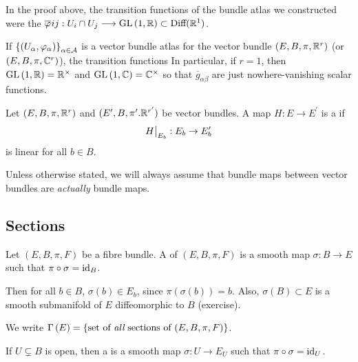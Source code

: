 \documentclass[main.tex]{subfiles}
\begin{document}
\begin{note}
In the proof above, the transition functions of the bundle atlas we constructed were the $\overline{\varphi}_{}ij: U_i \cap U_j \longrightarrow \text{GL}\left( 1, \mathbb{R} \right) \subset \text{Diff}(\mathbb{R}^1)$.
\end{note}

\begin{rmk}
If $\left\{ \left(  U_\alpha, \varphi_\alpha  \right)\right\}_{\alpha \in \mathcal{A}}$ is a vector bundle atlas for the vector bundle $(E, B, \pi, \mathbb{R}^r)$ (or $(E, B, \pi, \mathbb{C}^r)$), the transition functions 
 In particular, if $r=1$, then $\text{GL}\left( 1, \mathbb{R} \right) = \mathbb{R}^\times$ and $\text{GL}\left( 1, \mathbb{C} \right) = \mathbb{C}^\times$ so that $\overline{g}_{\alpha\beta}$ are just nowhere-vanishing scalar functions.
\end{rmk}

\begin{defn}
Let $(E, B, \pi, \mathbb{R}^r)$ and $(E^\prime, B, \pi^\prime. \mathbb{R}^{r^\prime})$ be vector bundles. A map $H: E \to E^\prime$ is a  if 
\[
H\big|_{E_b} : E_b \to E_{b}^\prime
\]
is linear for all $b \in B$.
\end{defn}

\begin{note}
Unless otherwise stated, we will always assume that bundle maps between vector bundles are {\it actually} bundle maps.
\end{note}

\subsection{Sections}

\begin{defn}
Let $(E, B, \pi, F)$ be a fibre bundle. A  of $(E, B, \pi, F)$ is a smooth map $\sigma: B \to E$ such that $\pi \circ \sigma = \text{id}_{B}$. 
\end{defn}

Then for all $b \in B$, $\sigma(b) \in E_b$, since $\pi(\sigma(b)) = b$. Also, $\sigma(B) \subset E$ is a smooth submanifold of $E$ diffeomorphic to $B$ (exercise).

\begin{notation}
We write $\Gamma\left( E \right) = \left\{ \text{set of {\it all} sections of $(E,B,\pi,F)$} \right\}$.
\end{notation}

\begin{defn}
If $U \subsetneq B$ is open, then a  is a smooth map $\sigma: U \to E_U$ such that $\pi \circ \sigma = \text{id}_{U}$.
\end{defn}
\end{document}
